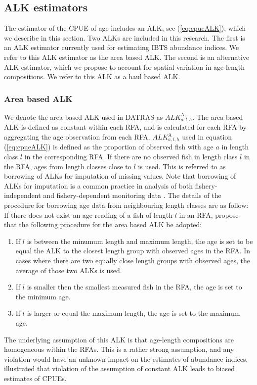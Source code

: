 \documentclass[a4paper 12pt]{article}
\numberwithin{equation}{section}
\begin{document}
\subsection{ALK estimators}
\label{sec:alkmethods}
The estimator of the CPUE of age includes an ALK, see (\ref{eq:cpueALK}), which we describe in this section. Two ALKs are included in this research. The first is an ALK estimator currently used for estimating IBTS abundance indices. We refer to this ALK estimator as the area based ALK. The second is an alternative ALK estimator, which we propose to account for spatial variation in age-length compositions. We refer to this ALK as a haul based ALK.

\subsubsection{Area based ALK}
\label{sec:datrasalkestimator}
We denote the area based ALK used in DATRAS as $ALK^{\text{A}}_{a,l,h}$. The area based ALK is defined as constant within each RFA, and is calculated for each RFA by aggregating the age observation from each RFA. $ALK^{\text{A}}_{a,l,h}$ used in equation (\ref{eq:cpueALK}) is defined as the proportion of observed fish with age $a$ in length class $l$ in the corresponding RFA. If there are no observed fish in length class $l$ in the RFA, ages from length classes close to $l$ is used. This is referred to as borrowing of ALKs for imputation of missing values. Note that borrowing of ALKs for imputation is a common practice in analysis of both fishery-independent and fishery-dependent monitoring data \citep[see for example,][]{aanes2015efficient,catchpole2017challenges}. The details of the procedure for borrowing age data from neighbouring length classes are as follow: If there does not exist an age reading of a fish of length $l$ in an RFA,  \citet{ICES2013} propose that the following procedure  for the area based ALK be adopted:
\begin{enumerate}
\item If $l$ is between the minumum length and maximum length, the age is set to be equal the ALK to the closest length group with observed ages in the RFA. In cases where there are two equally close length groups with observed ages, the average of those two ALKs is used. 
\item If $l$ is smaller then the smallest measured fish in the RFA, the age is set to the minimum age.
\item If $l$ is larger or equal the maximum length, the age is set to the maximum age.
\end{enumerate}
The underlying assumption of this ALK  is that age-length compositions are homogeneous within the RFAs. This is a rather strong assumption, and any violation would have an unknown impact on the estimates of abundance indices. \citet{aanes2015efficient} illustrated that violation of the assumption of constant ALK leads to biased estimates of CPUEs. 
\end{document}
